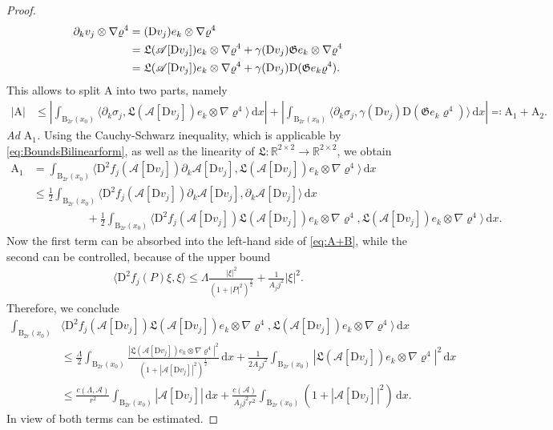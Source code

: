 \documentclass[a4paper,10pt,reqno,oneside]{amsart}
\numberwithin{equation}{section}
\newcommand{\R}{\mathbb R}
\newcommand{\ball}{\mathrm{B}}
\newcommand{\A}{\mathscr{A}}
\newcommand{\D}{\mathrm{D}}
\newcommand{\dx}[1]{\,\mathrm{d}#1}
\newcommand{\del}{\partial}
\newcommand{\skalarProd}[2]{\big\langle#1,#2\big\rangle}
\newcommand{\abs}[1]{\left\lvert#1\right\rvert}
\begin{document}
\begin{proof}
	\begin{align}\label{eq:Decomposition0}
		\del_k v_j \otimes \nabla \varrho^4  \notag
		&= (\D v_j)e_k\otimes \nabla \varrho^4\\
	&=\mathfrak{L}(\A[\D v_j])e_k \otimes \nabla \varrho^4 + \gamma(\D v_j) \mathfrak{G}e_k\otimes \nabla \varrho^4\notag\\
	&=\mathfrak{L}(\A[\D v_j])e_k \otimes \nabla \varrho^4 + \gamma(\D v_j) \D(\mathfrak{G}e_k \varrho^4).
	\end{align}
This allows to split $\mathrm{A}$ into two parts, namely
	\begin{align*}
		\abs{\mathrm{A}} 
		&\leq \left\vert \int_{\ball_{2r}(x_0)}\skalarProd{\del_k \sigma_j}{\mathfrak{L}(  \A[\D v_j])e_k\otimes \nabla \varrho^4}\dx{x}\right\vert + \left\vert \int_{\ball_{2r}(x_0)} \skalarProd{\del_k \sigma_j}{\gamma(\D v_j) \D(\mathfrak{G}e_k \varrho^4)}\dx{x}\right\vert 
		\eqqcolon \mathrm{A}_1 + \mathrm{A}_2.
	\end{align*}
	\noindent \emph{Ad $\mathrm{A}_1$.}
	Using the Cauchy-Schwarz inequality, which is applicable by \eqref{eq:BoundsBilinearform}, as well as the linearity of  $\mathfrak{L}\colon \R^{2\times2}\to \R^{2\times2}$, we obtain 
	\begin{align*}
		\mathrm{A}_1 &= \int_{\ball_{2r}(x_0)} \skalarProd{\D^2 f_j(\A[\D v_j])\del_k \A[\D v_j]}{\mathfrak{L}(\A[\D v_j])e_k \otimes \nabla\varrho^4}\dx{x} \\
		&\leq \frac{1}{2} \int_{\ball_{2r}(x_0)}  \skalarProd{\D^2 f_j (\A[\D v_j])\del_k \A[\D v_j]}{\del_k \A[\D v_j]}\dx{x} \\
		&\hspace{2cm} + \frac{1}{2}\int_{\ball_{2r}(x_0)}  \skalarProd{\D^2 f_j(\A[\D v_j])\mathfrak{L}(\A[\D v_j])e_k\otimes \nabla\varrho^4}{\mathfrak{L}(\A[\D v_j])e_k\otimes \nabla\varrho^4}\dx{x}.
	\end{align*}
	Now the first term can be absorbed into the left-hand side of \eqref{eq:A+B}, while the second can be controlled, because of the upper bound
	\begin{align*}
	\skalarProd{\D^2 f_j (P)\xi}{\xi} \leq \Lambda \frac{\abs{\xi}^2}{(1+\abs{P}^2)^{\frac{1}{2}}} + \frac{1}{A_j j^2}\abs{\xi}^2.
	\end{align*}	
	Therefore, we conclude 
	\begin{align*}
		\int_{\ball_{2r}(x_0)}  &\skalarProd{\D^2 f_j(\A[\D v_j])\mathfrak{L}(\A[\D v_j])e_k\otimes \nabla\varrho^4}{\mathfrak{L}(\A[\D v_j])e_k\otimes \nabla\varrho^4}\dx{x}\\
		&\leq \frac{\Lambda}{2}\int_{\ball_{2r}(x_0)} \frac{\abs{\mathfrak{L}(\A[\D v_j])e_k\otimes \nabla\varrho^4}^2}{(1+\abs{\A[\D v_j] }^2)^{\frac{1}{2}}}\dx{x}
		+ \frac{1}{2A_j j^2 }\int_{\ball_{2r}(x_0)}  \abs{\mathfrak{L}(\A[\D v_j])e_k\otimes \nabla\varrho^4}^2\dx{x}\\
		&\leq \frac{c(\Lambda, \A)}{r^2} \int_{\ball_{2r}(x_0)}  \abs{\A[\D v_j]}\dx{x} + \frac{c(\A)}{ A_j j^2 r^2} \int_{\ball_{2r}(x_0)}  (1+\abs{\A[\D v_j]}^2) \dx{x}. 
	\end{align*}
	In view of  both terms can be estimated.


\end{proof}
\end{document}
